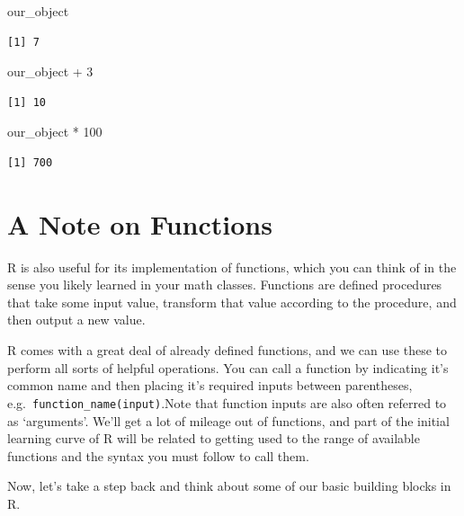\documentclass[
  letterpaper,
  DIV=11,
  numbers=noendperiod]{scrreprt}
\newenvironment{Shaded}{\begin{snugshade}}{\end{snugshade}}
\newcommand{\DecValTok}[1]{\textcolor[rgb]{0.68,0.00,0.00}{#1}}
\newcommand{\NormalTok}[1]{\textcolor[rgb]{0.00,0.23,0.31}{#1}}
\newcommand{\SpecialCharTok}[1]{\textcolor[rgb]{0.37,0.37,0.37}{#1}}
\begin{document}
\begin{Shaded}
\begin{Highlighting}[]
\NormalTok{our\_object}
\end{Highlighting}
\end{Shaded}

\begin{verbatim}
[1] 7
\end{verbatim}

\begin{Shaded}
\begin{Highlighting}[]
\NormalTok{our\_object }\SpecialCharTok{+} \DecValTok{3}
\end{Highlighting}
\end{Shaded}

\begin{verbatim}
[1] 10
\end{verbatim}

\begin{Shaded}
\begin{Highlighting}[]
\NormalTok{our\_object }\SpecialCharTok{*} \DecValTok{100}
\end{Highlighting}
\end{Shaded}

\begin{verbatim}
[1] 700
\end{verbatim}

\section{A Note on Functions}\label{a-note-on-functions}

R is also useful for its implementation of functions, which you can
think of in the sense you likely learned in your math classes. Functions
are defined procedures that take some input value, transform that value
according to the procedure, and then output a new value.

R comes with a great deal of already defined functions, and we can use
these to perform all sorts of helpful operations. You can call a
function by indicating it's common name and then placing it's required
inputs between parentheses, e.g.~\texttt{function\_name(input)}.Note
that function inputs are also often referred to as `arguments'. We'll
get a lot of mileage out of functions, and part of the initial learning
curve of R will be related to getting used to the range of available
functions and the syntax you must follow to call them.

Now, let's take a step back and think about some of our basic building
blocks in R.
\end{document}
